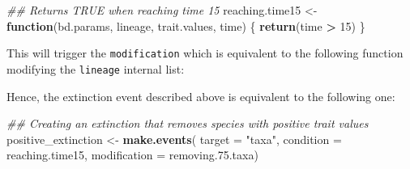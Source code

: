 \documentclass[
]{article}
\newenvironment{Shaded}{\begin{snugshade}}{\end{snugshade}}
\newcommand{\CommentTok}[1]{\textcolor[rgb]{0.56,0.35,0.01}{\textit{#1}}}
\newcommand{\ControlFlowTok}[1]{\textcolor[rgb]{0.13,0.29,0.53}{\textbf{#1}}}
\newcommand{\DataTypeTok}[1]{\textcolor[rgb]{0.13,0.29,0.53}{#1}}
\newcommand{\DecValTok}[1]{\textcolor[rgb]{0.00,0.00,0.81}{#1}}
\newcommand{\FloatTok}[1]{\textcolor[rgb]{0.00,0.00,0.81}{#1}}
\newcommand{\KeywordTok}[1]{\textcolor[rgb]{0.13,0.29,0.53}{\textbf{#1}}}
\newcommand{\NormalTok}[1]{#1}
\newcommand{\OperatorTok}[1]{\textcolor[rgb]{0.81,0.36,0.00}{\textbf{#1}}}
\newcommand{\StringTok}[1]{\textcolor[rgb]{0.31,0.60,0.02}{#1}}
\begin{document}
\begin{Shaded}
\begin{Highlighting}[]
\CommentTok{\#\# Returns TRUE when reaching time 15}
\NormalTok{reaching.time15 \textless{}{-}}\StringTok{ }\ControlFlowTok{function}\NormalTok{(bd.params, lineage, trait.values, time) \{}
    \KeywordTok{return}\NormalTok{(time }\OperatorTok{\textgreater{}}\StringTok{ }\DecValTok{15}\NormalTok{)}
\NormalTok{\}}
\end{Highlighting}
\end{Shaded}

This will trigger the \texttt{modification} which is equivalent to the
following function modifying the \texttt{lineage} internal list:

\begin{Shaded}
\end{Shaded}

Hence, the extinction event described above is equivalent to the
following one:

\begin{Shaded}
\begin{Highlighting}[]
\CommentTok{\#\# Creating an extinction that removes species with positive trait values}
\NormalTok{positive\_extinction \textless{}{-}}\StringTok{ }\KeywordTok{make.events}\NormalTok{(}
    \DataTypeTok{target       =} \StringTok{"taxa"}\NormalTok{,}
    \DataTypeTok{condition    =}\NormalTok{ reaching.time15,}
    \DataTypeTok{modification =}\NormalTok{ removing.}\FloatTok{75.}\NormalTok{taxa)}
\end{Highlighting}
\end{Shaded}
\end{document}
